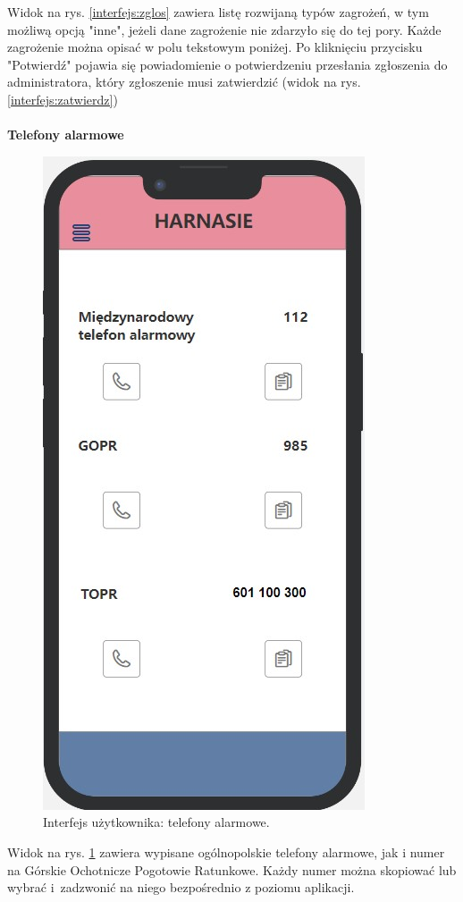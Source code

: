    Widok na rys. \ref{interfejs:zglos} zawiera listę rozwijaną typów zagrożeń, w tym możliwą opcją "inne", jeżeli dane zagrożenie nie zdarzyło się do tej pory. Każde zagrożenie można opisać w polu tekstowym poniżej. Po kliknięciu przycisku "Potwierdź" pojawia się powiadomienie o potwierdzeniu przesłania zgłoszenia do administratora, który zgłoszenie musi zatwierdzić (widok na rys. \ref{interfejs:zatwierdz}) \\
   \\
   \textbf{Telefony alarmowe}
    \begin{figure}[H]
        \centering
        \includegraphics[scale=0.5]{img/interfejsy/if_alarmm.jpg}
        \caption{Interfejs użytkownika: telefony alarmowe.}
        \label{interfejs:alarm}
    \end{figure}
   Widok na rys. \ref{interfejs:alarm} zawiera wypisane ogólnopolskie telefony alarmowe, jak i numer na Górskie Ochotnicze Pogotowie Ratunkowe. Każdy numer można skopiować lub wybrać i~zadzwonić na niego bezpośrednio z poziomu aplikacji.

